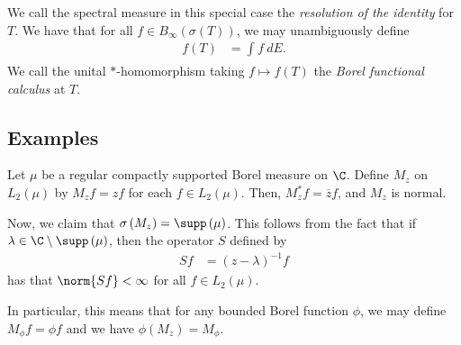 \documentclass[10pt]{mypackage}
\begin{document}
We call the spectral measure in this special case the \textit{resolution of the identity} for $T$. We have that for all $f\in B_{\infty}(\sigma(T))$, we may unambiguously define
\begin{align*}
  f(T) &= \int_{}^{} f\:dE.
\end{align*}
We call the unital $\ast$-homomorphism taking $f\mapsto f(T)$ the \textit{Borel functional calculus} at $T$.
\subsection{Examples}%
\begin{example}
  Let $\mu$ be a regular compactly supported Borel measure on $\C$. Define $M_z$ on $L_2\left( \mu \right)$ by $M_zf = zf$ for each $f\in L_2\left( \mu \right)$. Then, $M_z^{\ast}f = \overline{z}f$, and $M_z$ is normal.

  Now, we claim that $\sigma\left( M_z \right) = \supp\left( \mu \right)$. This follows from the fact that if $\lambda\in \C\setminus \supp\left( \mu \right)$, then the operator $S$ defined by
  \begin{align*}
    Sf &= \left( z-\lambda \right)^{-1}f
  \end{align*}
  has that $\norm{Sf} < \infty$ for all $f\in L_2\left( \mu \right)$.

  In particular, this means that for any bounded Borel function $\phi$, we may define $M_{\phi}f = \phi f$ and we have $\phi\left( M_z \right) = M_{\phi}$.
\end{example}
\end{document}
